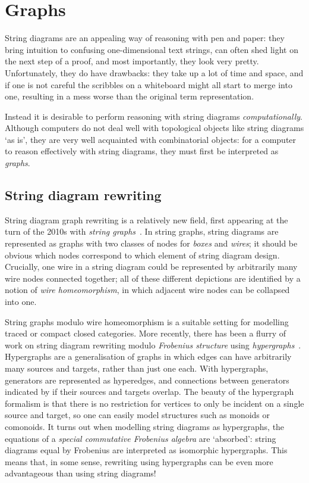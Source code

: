 \chapter{Graphs}

String diagrams are an appealing way of reasoning with pen and paper: they bring
intuition to confusing one-dimensional text strings, can often shed light on the
next step of a proof, and most importantly, they look very pretty.
Unfortunately, they do have drawbacks: they take up a lot of time and space, and
if one is not careful the scribbles on a whiteboard might all start to merge
into one, resulting in a mess worse than the original term representation.

Instead it is desirable to perform reasoning with string diagrams
\emph{computationally}.
Although computers do not deal well with topological objects like string
diagrams `as is', they are very well acquainted with combinatorial objects: for
a computer to reason effectively with string diagrams, they must first be
interpreted as \emph{graphs}.

\section{String diagram rewriting}

String diagram graph rewriting is a relatively new field, first appearing at the
turn of the 2010s with \emph{string graphs}~\cite{%
    dixon2010open,dixon2013opengraphs,kissinger2012pictures%
}.
In string graphs, string diagrams are represented as graphs with two classes of
nodes for \emph{boxes} and \emph{wires}; it should be obvious which nodes
correspond to which element of string diagram design.
Crucially, one wire in a string diagram could be represented by arbitrarily
many wire nodes connected together; all of these different depictions are
identified by a notion of \emph{wire homeomorphism}, in which adjacent wire
nodes can be collapsed into one.


String graphs modulo wire homeomorphism is a suitable setting for modelling
traced or compact closed categories.
More recently, there has been a flurry of work on string diagram rewriting
modulo \emph{Frobenius structure} using \emph{hypergraphs}~\cite{%
    bonchi2016rewriting,zanasi2017rewriting,bonchi2017confluence,%
    bonchi2018rewriting,bonchi2022string,bonchi2022stringa,bonchi2022stringb%
}.
Hypergraphs are a generalisation of graphs in which edges can have arbitrarily
many sources and targets, rather than just one each.
With hypergraphs, generators are represented as hyperedges, and connections
between generators indicated by if their sources and targets overlap.
The beauty of the hypergraph formalism is that there is no restriction for
vertices to only be incident on a single source and target, so one can easily
model structures such as monoids or comonoids.
It turns out when modelling string diagrams as hypergraphs, the equations of
a \emph{special commutative Frobenius algebra} are `absorbed': string diagrams
equal by Frobenius are interpreted as isomorphic hypergraphs.
This means that, in some sense, rewriting using hypergraphs can be even more
advantageous than using string diagrams!

